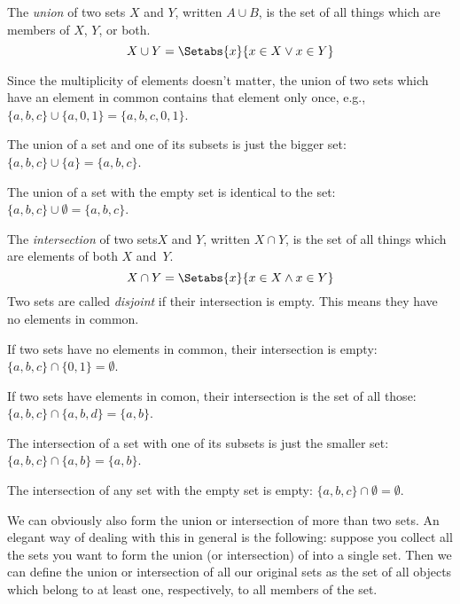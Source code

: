 \documentclass[../../include/open-logic-section]{subfiles}
\begin{document}

\begin{defn} 
The \emph{union} of two sets $X$ and $Y$, written $A \cup B$, is the
set of all things which are members of $X$, $Y$, or both.
\[
X \cup Y = \Setabs{x}{x \in X \lor x\in Y}
\]
\end{defn}

\begin{ex}
Since the multiplicity of elements doesn't matter, the union of two
sets which have an element in common contains that element only once,
e.g., $\{ a, b, c\} \cup \{ a, 0, 1\} = \{a, b, c, 0, 1\}$.

The union of a set and one of its subsets is just the bigger set: $\{a,
b, c \} \cup \{a \} = \{a, b, c\}$.

The union of a set with the empty set is identical to the set: $\{a,
b, c \} \cup \emptyset = \{a, b, c \}$.
\end{ex}

\begin{defn}
The \emph{intersection} of two sets$X$ and $Y$, written $X \cap Y$, is
the set of all things which are elements of both $X$ and~$Y$. 
\[
X \cap Y = \Setabs{x}{x \in X \land x\in Y}
\]
Two sets are called \emph{disjoint} if their intersection is
empty. This means they have no elements in common.
\end{defn}

\begin{ex}
If two sets have no elements in common, their intersection is empty:
$\{ a, b, c\} \cap \{ 0, 1\} = \emptyset$.

If two sets have elements in comon, their intersection is the set of
all those: $\{a, b, c \} \cap \{a, b, d \} = \{a, b\}$.

The intersection of a set with one of its subsets is just the smaller
set: $\{a, b, c\} \cap \{a, b\} = \{a, b\}$.

The intersection of any set with the empty set is empty: $\{a, b, c \}
\cap \emptyset = \emptyset$.
\end{ex}

\begin{explain}
We can obviously also form the union or intersection of more than two
sets.  An elegant way of dealing with this in general is the
following: suppose you collect all the sets you want to form the union
(or intersection) of into a single set. Then we can define the union
or intersection of all our original sets as the set of all objects
which belong to at least one, respectively, to all members of the set.
\end{explain}
\end{document}
